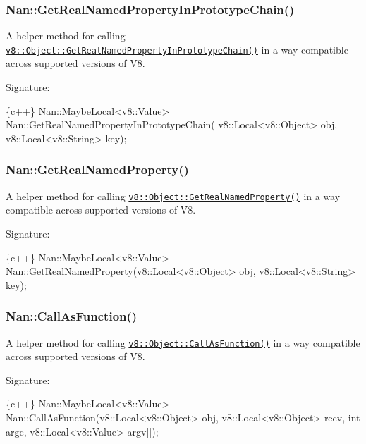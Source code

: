  \subsubsection*{Nan\+::\+Get\+Real\+Named\+Property\+In\+Prototype\+Chain()}

A helper method for calling \href{https://v8docs.nodesource.com/io.js-3.0/db/d85/classv8_1_1_object.html#a8700b1862e6b4783716964ba4d5e6172}{\tt {\ttfamily v8\+::\+Object\+::\+Get\+Real\+Named\+Property\+In\+Prototype\+Chain()}} in a way compatible across supported versions of V8.

Signature\+:


\begin{DoxyCode}
\{c++\}
Nan::MaybeLocal<v8::Value> Nan::GetRealNamedPropertyInPrototypeChain(
    v8::Local<v8::Object> obj,
    v8::Local<v8::String> key);
\end{DoxyCode}


\label{_api_nan_get_real_named_property}%
 \subsubsection*{Nan\+::\+Get\+Real\+Named\+Property()}

A helper method for calling \href{https://v8docs.nodesource.com/io.js-3.0/db/d85/classv8_1_1_object.html#a84471a824576a5994fdd0ffcbf99ccc0}{\tt {\ttfamily v8\+::\+Object\+::\+Get\+Real\+Named\+Property()}} in a way compatible across supported versions of V8.

Signature\+:


\begin{DoxyCode}
\{c++\}
Nan::MaybeLocal<v8::Value> Nan::GetRealNamedProperty(v8::Local<v8::Object> obj,
                                                     v8::Local<v8::String> key);
\end{DoxyCode}


\label{_api_nan_call_as_function}%
 \subsubsection*{Nan\+::\+Call\+As\+Function()}

A helper method for calling \href{https://v8docs.nodesource.com/io.js-3.0/db/d85/classv8_1_1_object.html#a9ef18be634e79b4f0cdffa1667a29f58}{\tt {\ttfamily v8\+::\+Object\+::\+Call\+As\+Function()}} in a way compatible across supported versions of V8.

Signature\+:


\begin{DoxyCode}
\{c++\}
Nan::MaybeLocal<v8::Value> Nan::CallAsFunction(v8::Local<v8::Object> obj,
                                               v8::Local<v8::Object> recv,
                                               int argc,
                                               v8::Local<v8::Value> argv[]);
\end{DoxyCode}


